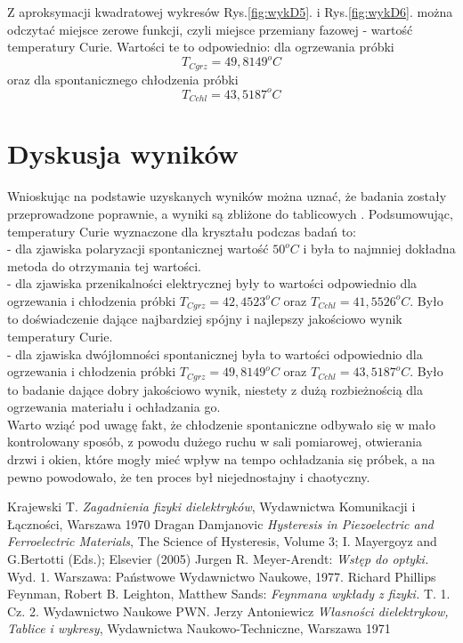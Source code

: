 \documentclass{article}
\begin{document}
Z aproksymacji kwadratowej wykresów Rys.\ref{fig:wykD5}. i Rys.\ref{fig:wykD6}. można odczytać miejsce zerowe funkcji, czyli miejsce przemiany fazowej - wartość temperatury Curie. Wartości te to odpowiednio: dla ogrzewania próbki
\begin{equation}
T_{C grz}=49,8149^{o}C
\end{equation}
oraz dla spontanicznego chłodzenia próbki
\begin{equation}
T_{C chl}=43,5187^{o}C
\end{equation}

\section{Dyskusja wyników}
Wnioskując na podstawie uzyskanych wyników można uznać, że badania zostały przeprowadzone poprawnie, a wyniki są zbliżone do tablicowych \cite{antoniewicz}. Podsumowując, temperatury Curie wyznaczone dla kryształu podczas badań to:\\
- dla zjawiska polaryzacji spontanicznej wartość $50^{o}C$ i była to najmniej dokładna metoda do otrzymania tej wartości.\\
- dla zjawiska przenikalności elektrycznej były to wartości odpowiednio dla ogrzewania i chłodzenia próbki $T_{C grz}=42,4523^{o}C$ oraz $T_{C chl}=41,5526^{o}C$. Było to doświadczenie dające najbardziej spójny i najlepszy jakościowo wynik temperatury Curie.\\
- dla zjawiska dwójłomności spontanicznej była to wartości odpowiednio dla ogrzewania i chłodzenia próbki $T_{C grz}=49,8149^{o}C$ oraz $T_{C chl}=43,5187^{o}C$. Było to badanie dające dobry jakościowo wynik, niestety z dużą rozbieżnością dla ogrzewania materiału i ochładzania go.\\
Warto wziąć pod uwagę fakt, że chłodzenie spontaniczne odbywało się w mało kontrolowany sposób, z powodu dużego ruchu w sali pomiarowej, otwierania drzwi i okien, które mogły mieć wpływ na tempo ochładzania się próbek, a na pewno powodowało, że ten proces był niejednostajny i chaotyczny.


\begin{thebibliography}{99}
	 Krajewski T. \textit{Zagadnienia fizyki dielektryków}, Wydawnictwa Komunikacji i Łączności, Warszawa 1970 
	Dragan Damjanovic \textit{Hysteresis in Piezoelectric
and Ferroelectric Materials}, The Science of Hysteresis, Volume 3; I. Mayergoyz and G.Bertotti (Eds.); Elsevier (2005)
	 Jurgen R. Meyer-Arendt: \textit{Wstęp do optyki.} Wyd. 1. Warszawa: Państwowe Wydawnictwo Naukowe, 1977.
	 Richard Phillips Feynman, Robert B. Leighton, Matthew Sands: \textit{Feynmana wykłady z fizyki.} T. 1. Cz. 2. Wydawnictwo Naukowe PWN.
	 Jerzy Antoniewicz \textit{Własności dielektrykow, Tablice i wykresy}, Wydawnictwa Naukowo-Techniczne, Warszawa 1971
\end{thebibliography}
\end{document}
